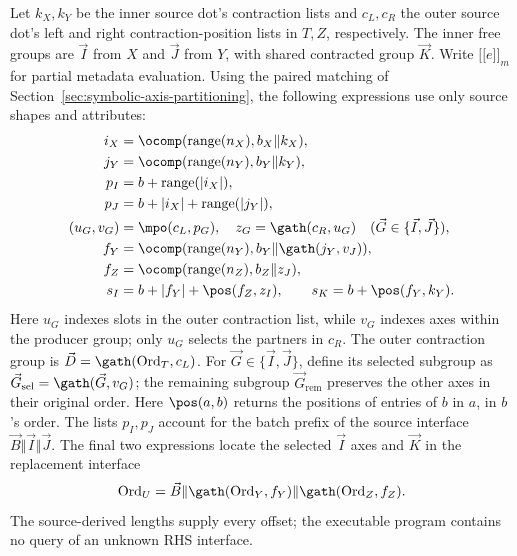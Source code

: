 Let $k_X,k_Y$ be the inner source dot's contraction lists and
$c_L,c_R$ the outer source dot's left and right contraction-position lists
in $T,Z$, respectively. The inner free groups
are $\vec I$ from $X$ and $\vec J$ from $Y$, with shared contracted group
$\vec K$. Write $\lbrack\!\lbrack e\rbrack\!\rbrack_m$ for partial metadata
evaluation. Using the paired matching of
Section~\ref{sec:symbolic-axis-partitioning}, the following expressions
use only source shapes and attributes:
\begin{equation}
\begin{aligned}
 i_X&=\ocomp(\operatorname{range}(n_X),b_X\Vert k_X),\\
 j_Y&=\ocomp(\operatorname{range}(n_Y),b_Y\Vert k_Y),\\
 p_I&=b+\operatorname{range}(|i_X|),\\
 p_J&=b+|i_X|+\operatorname{range}(|j_Y|),\\
 (u_G,v_G)&=\mpo(c_L,p_G),\quad z_G=\gath(c_R,u_G)
                 \quad(\vec G\in\{\vec I,\vec J\}),\\
 f_Y&=\ocomp(\operatorname{range}(n_Y),
                      b_Y\Vert\gath(j_Y,v_J)),\\
 f_Z&=\ocomp(\operatorname{range}(n_Z),b_Z\Vert z_J),\\
 s_I&=b+|f_Y|+\pos(f_Z,z_I),\qquad
 s_K=b+\pos(f_Y,k_Y).
\end{aligned}
\label{eq:batched-program-locals}
\end{equation}
Here $u_G$ indexes slots in the outer contraction list, while $v_G$
indexes axes within the producer group; only $u_G$ selects the partners
in $c_R$. The outer contraction group is
$\vec D=\gath(\operatorname{Ord}_T,c_L)$.
For $\vec G\in\{\vec I,\vec J\}$, define its selected subgroup as
$\vec G_{\mathrm{sel}}=\gath(\vec G,v_G)$; the remaining subgroup
$\vec G_{\mathrm{rem}}$ preserves the other axes in their original order.
Here $\pos(a,b)$ returns the positions of entries of $b$ in $a$, in
$b$'s order. The lists $p_I,p_J$ account for the batch prefix of the source interface
$\vec B\Vert \vec I\Vert \vec J$. The final two expressions locate the selected $\vec I$
axes and $\vec K$ in the replacement interface
\begin{equation}
 \operatorname{Ord}_U=\vec B\Vert\gath(\operatorname{Ord}_Y,f_Y)
                  \Vert\gath(\operatorname{Ord}_Z,f_Z).
 \label{eq:batched-u-interface}
\end{equation}
The source-derived lengths supply every offset; the executable program
contains no query of an unknown RHS interface.

